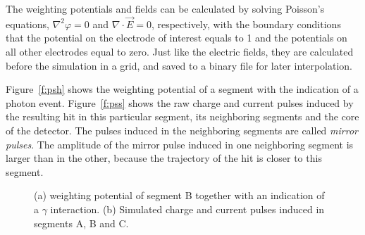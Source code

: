 \documentclass[epj,referee]{svjour}
\begin{document}
The weighting potentials and fields can be calculated by solving
Poisson's equations, $\nabla^{2} \varphi = 0$ and $\nabla \cdot
\vec{E} = 0$, respectively, with the boundary conditions that the
potential on the electrode of interest equals to 1 and the potentials
on all other electrodes equal to zero. Just like the electric fields,
they are calculated before the simulation in a grid, and saved to a
binary file for later interpolation.

Figure~\ref{f:psh} shows the weighting potential of a segment with the
indication of a photon event. Figure~\ref{f:pss} shows the raw charge
and current pulses induced by the resulting hit in this particular
segment, its neighboring segments and the core of the detector. The
pulses induced in the neighboring segments are called \emph{mirror
pulses}. The amplitude of the mirror pulse induced in one neighboring
segment is larger than in the other, because the trajectory of the hit
is closer to this segment.
\begin{figure}[tb] 
\centering 
{}%
% 
\caption{(a) weighting potential of segment B together with an
indication of a $\gamma$ interaction. (b) Simulated charge and current
pulses induced in segments A, B and C.}
\label{f:ps} 
\end{figure} 
\end{document}
